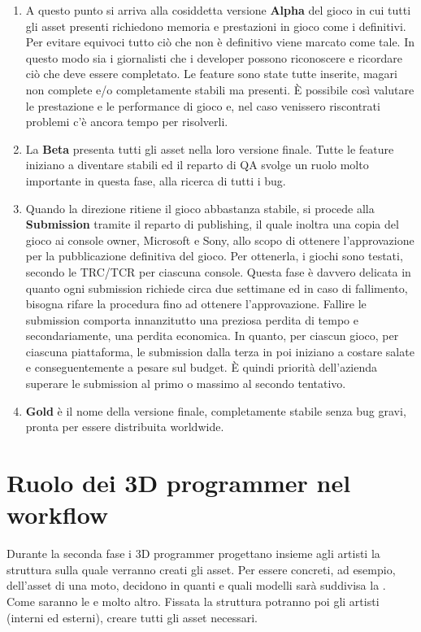 \begin{enumerate}
	\item A questo punto si arriva alla cosiddetta versione \textbf{Alpha} del gioco in cui tutti gli asset presenti richiedono memoria e prestazioni in gioco come i definitivi. Per evitare equivoci tutto ciò che non è definitivo viene marcato come tale. In questo modo sia i giornalisti che i developer possono riconoscere e ricordare ciò che deve essere completato. Le feature sono state tutte inserite, magari non complete e/o completamente stabili ma presenti. È possibile così valutare le prestazione e le performance di gioco e, nel caso venissero riscontrati problemi c'è ancora tempo per risolverli.
	\item La \textbf{Beta} presenta tutti gli asset nella loro versione finale. Tutte le feature iniziano a diventare stabili ed il reparto di QA svolge un ruolo molto importante in questa fase, alla ricerca di tutti i bug.
	\item Quando la direzione ritiene il gioco abbastanza stabile, si procede alla \textbf{Submission} tramite il reparto di publishing, il quale inoltra una copia del gioco ai console owner, Microsoft e Sony, allo scopo di ottenere l'approvazione per la pubblicazione definitiva del gioco. Per ottenerla, i giochi sono testati, secondo le TRC/TCR per ciascuna console. Questa fase è davvero delicata in quanto ogni submission richiede circa due settimane ed in caso di fallimento, bisogna rifare la procedura fino ad ottenere l'approvazione. Fallire le submission comporta innanzitutto una preziosa perdita di tempo e secondariamente, una perdita economica. In quanto, per ciascun gioco, per ciascuna piattaforma, le submission dalla terza in poi iniziano a costare salate e conseguentemente a pesare sul budget. È quindi priorità dell'azienda superare le submission al primo o massimo al secondo tentativo.
	\item \textbf{Gold} è il nome della versione finale, completamente stabile senza bug gravi, pronta per essere distribuita worldwide.
\end{enumerate}

\section{Ruolo dei 3D programmer nel workflow}
\label{sec:ruolo-3D-programmer-workflow}

Durante la seconda fase i 3D programmer progettano insieme agli artisti la struttura sulla quale verranno creati gli asset. Per essere concreti, ad esempio, dell'asset di una moto, decidono in quanti e quali modelli sarà suddivisa la . Come saranno le  e molto altro. Fissata la struttura potranno poi gli artisti (interni ed esterni), creare tutti gli asset necessari.\\

